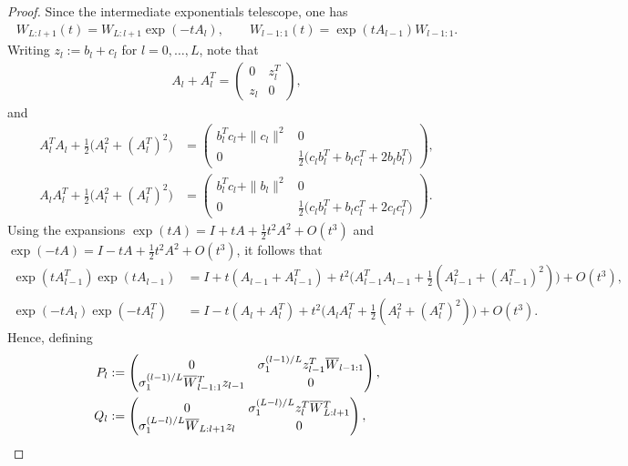 \documentclass{article}
\newcommand{\bW}{\smash{\overline{W}}\vphantom{W}}
\theoremstyle{plain}
\theoremstyle{definition}
\theoremstyle{remark}
\begin{document}
\begin{proof}
    Since the intermediate exponentials telescope, one has
    \begin{align}
    W_{L:l+1}(t)=W_{L:l+1}\exp(-tA_l),\qquad
    W_{l-1:1}(t)=\exp(tA_{l-1})W_{l-1:1}.
    \end{align}
    Writing $z_l:=b_l+c_l$ for $l=0,\dots,L$, note that
    \begin{align}
    A_l+A_l^T
    =
    \begin{pmatrix}
    0&z_l^T\\ z_l&0
    \end{pmatrix},
    \end{align}
    and
    \begin{align}
    A_l^TA_l+\frac12\big(A_l^2+(A_l^T)^2\big)
    &=
    \begin{pmatrix}
    b_l^Tc_l+\|c_l\|^2 & 0\\
    0 & \frac12\big(c_lb_l^T+b_lc_l^T+2b_lb_l^T\big)
    \end{pmatrix},
    \\
    A_lA_l^T+\frac12\big(A_l^2+(A_l^T)^2\big)
    &=
    \begin{pmatrix}
    b_l^Tc_l+\|b_l\|^2 & 0\\
    0 & \frac12\big(c_lb_l^T+b_lc_l^T+2c_lc_l^T\big)
    \end{pmatrix}.
    \end{align}
    Using the expansions $\exp(tA)=I+tA+\frac12t^2A^2+O(t^3)$ and
    $\exp(-tA)=I-tA+\frac12t^2A^2+O(t^3)$, it follows that
    \begin{align}
    \exp(tA_{l-1}^T)\exp(tA_{l-1})
    &=
    I+t(A_{l-1}+A_{l-1}^T)
    +t^2\Big(A_{l-1}^TA_{l-1}+\frac12(A_{l-1}^2+(A_{l-1}^T)^2)\Big)
    +O(t^3),
    \\
    \exp(-tA_l)\exp(-tA_l^T)
    &=
    I-t(A_l+A_l^T)
    +t^2\Big(A_lA_l^T+\frac12(A_l^2+(A_l^T)^2)\Big)
    +O(t^3).
    \end{align}
    Hence, defining
    \begin{align}
    P_l&:=
    \begin{pmatrix}
    0 & \sigma_1^{(l-1)/L}z_{l-1}^T\bW_{l-1:1}\\
    \sigma_1^{(l-1)/L}\bW_{l-1:1}^Tz_{l-1} & 0
    \end{pmatrix},
    \\
    Q_l&:=
    \begin{pmatrix}
    0 & \sigma_1^{(L-l)/L}z_l^T\bW_{L:l+1}^T\\
    \sigma_1^{(L-l)/L}\bW_{L:l+1}z_l & 0
    \end{pmatrix},
    \\

\end{align}
\end{proof}
\end{document}
